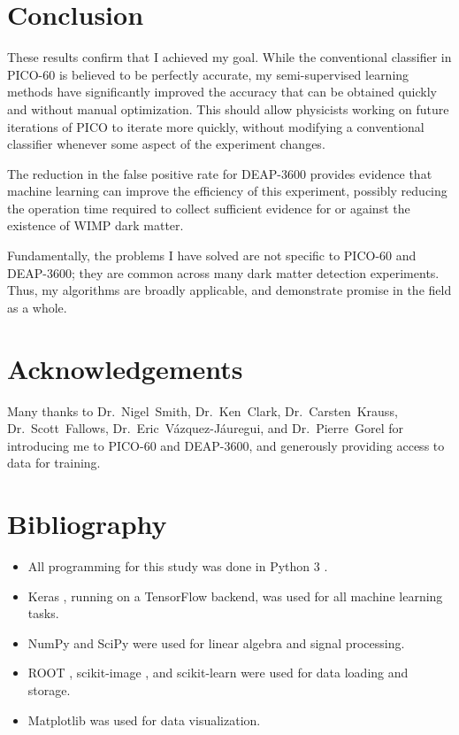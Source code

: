 \documentclass[12pt]{article}
\begin{document}
\section{Conclusion}

These results confirm that I achieved my goal. While the conventional classifier in PICO-60 is believed to be perfectly accurate, my semi-supervised learning methods have significantly improved the accuracy that can be obtained quickly and without manual optimization. This should allow physicists working on future iterations of PICO to iterate more quickly, without modifying a conventional classifier whenever some aspect of the experiment changes.

The reduction in the false positive rate for DEAP-3600 provides evidence that machine learning can improve the efficiency of this experiment, possibly reducing the operation time required to collect sufficient evidence for or against the existence of WIMP dark matter.

Fundamentally, the problems I have solved are not specific to PICO-60 and DEAP-3600; they are common across many dark matter detection experiments. Thus, my algorithms are broadly applicable, and demonstrate promise in the field as a whole.

\section{Acknowledgements}

Many thanks to Dr.~Nigel~Smith, Dr.~Ken~Clark, Dr.~Carsten~Krauss, Dr.~Scott~Fallows, Dr.~Eric~V\'azquez-J\'auregui, and Dr.~Pierre~Gorel for introducing me to PICO-60 and DEAP-3600, and generously providing access to data for training.

\singlespacing
\printbibliography
\doublespacing
\pagebreak

\section*{Bibliography}

\begin{itemize}
    \item All programming for this study was done in Python 3 \cite{python}.
    \item Keras \cite{keras}, running on a TensorFlow \cite{tensorflow} backend, was used for all machine learning tasks.
    \item NumPy \cite{numpy} and SciPy \cite{scipy} were used for linear algebra and signal processing.
    \item ROOT \cite{root}, scikit-image \cite{scikit-image}, and scikit-learn \cite{scikit-learn} were used for data loading and storage.
    \item Matplotlib \cite{matplotlib} was used for data visualization.
\end{itemize}
\end{document}
